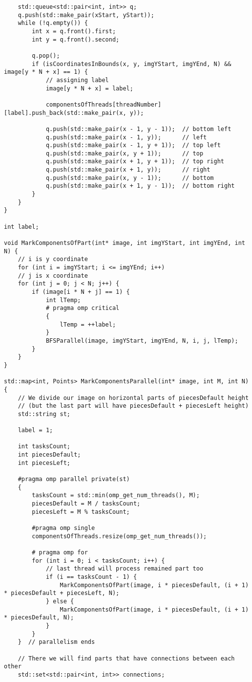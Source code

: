 \documentclass[14pt, russian]{extarticle}
\begin{document}
\begin{lstlisting}
	std::queue<std::pair<int, int>> q;
	q.push(std::make_pair(xStart, yStart));
	while (!q.empty()) {
		int x = q.front().first;
		int y = q.front().second;
		
		q.pop();
		if (isCoordinatesInBounds(x, y, imgYStart, imgYEnd, N) && image[y * N + x] == 1) {
			// assigning label
			image[y * N + x] = label;
			
			componentsOfThreads[threadNumber][label].push_back(std::make_pair(x, y));
			
			q.push(std::make_pair(x - 1, y - 1));  // bottom left
			q.push(std::make_pair(x - 1, y));      // left
			q.push(std::make_pair(x - 1, y + 1));  // top left
			q.push(std::make_pair(x, y + 1));      // top
			q.push(std::make_pair(x + 1, y + 1));  // top right
			q.push(std::make_pair(x + 1, y));      // right
			q.push(std::make_pair(x, y - 1));      // bottom
			q.push(std::make_pair(x + 1, y - 1));  // bottom right
		}
	}
}

int label;

void MarkComponentsOfPart(int* image, int imgYStart, int imgYEnd, int N) {
	// i is y coordinate
	for (int i = imgYStart; i <= imgYEnd; i++)
	// j is x coordinate
	for (int j = 0; j < N; j++) {
		if (image[i * N + j] == 1) {
			int lTemp;
			# pragma omp critical
			{
				lTemp = ++label;
			}
			BFSParallel(image, imgYStart, imgYEnd, N, i, j, lTemp);
		}
	}
}

std::map<int, Points> MarkComponentsParallel(int* image, int M, int N) {
	// We divide our image on horizontal parts of piecesDefault height
	// (but the last part will have piecesDefault + piecesLeft height)
	std::string st;
	
	label = 1;
	
	int tasksCount;
	int piecesDefault;
	int piecesLeft;
	
	#pragma omp parallel private(st)
	{
		tasksCount = std::min(omp_get_num_threads(), M);
		piecesDefault = M / tasksCount;
		piecesLeft = M % tasksCount;
		
		#pragma omp single
		componentsOfThreads.resize(omp_get_num_threads());
		
		# pragma omp for
		for (int i = 0; i < tasksCount; i++) {
			// last thread will process remained part too
			if (i == tasksCount - 1) {
				MarkComponentsOfPart(image, i * piecesDefault, (i + 1) * piecesDefault + piecesLeft, N);
			} else {
				MarkComponentsOfPart(image, i * piecesDefault, (i + 1) * piecesDefault, N);
			}
		}
	}  // parallelism ends
	
	// There we will find parts that have connections between each other
	std::set<std::pair<int, int>> connections;
	

\end{lstlisting}
\end{document}
